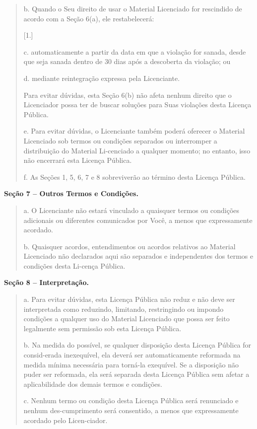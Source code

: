 \documentclass[
]{article}
\begin{document}
\begin{quote}
b. Quando o Seu direito de usar o Material Licenciado for rescindido de
acordo com a Seção 6(a), ele restabelecerá:

{[}1.{]}

c. automaticamente a partir da data em que a violação for sanada, desde
que seja sanada dentro de 30 dias após a descoberta da violação; ou

d. mediante reintegração expressa pela Licenciante.

Para evitar dúvidas, esta Seção 6(b) não afeta nenhum direito que o
Licenciador possa ter de buscar soluções para Suas violações desta
Licença Pública.

e. Para evitar dúvidas, o Licenciante também poderá oferecer o Material
Licenciado sob termos ou condições separados ou interromper a
distribuição do Material Li-cenciado a qualquer momento; no entanto,
isso não encerrará esta Licença Pública.

f. As Seções 1, 5, 6, 7 e 8 sobreviverão ao término desta Licença
Pública.
\end{quote}

\textbf{Seção 7 -- Outros Termos e Condições.}

\begin{quote}
a. O Licenciante não estará vinculado a quaisquer termos ou condições
adicionais ou diferentes comunicados por Você, a menos que expressamente
acordado.

b. Quaisquer acordos, entendimentos ou acordos relativos ao Material
Licenciado não declarados aqui são separados e independentes dos termos
e condições desta Li-cença Pública.
\end{quote}

\textbf{Seção 8 -- Interpretação.}

\begin{quote}
a. Para evitar dúvidas, esta Licença Pública não reduz e não deve ser
interpretada como reduzindo, limitando, restringindo ou impondo
condições a qualquer uso do Material Licenciado que possa ser feito
legalmente sem permissão sob esta Licença Pública.

b. Na medida do possível, se qualquer disposição desta Licença Pública
for consid-erada inexequível, ela deverá ser automaticamente reformada
na medida mínima necessária para torná-la exequível. Se a disposição não
puder ser reformada, ela será separada desta Licença Pública sem afetar
a aplicabilidade dos demais termos e condições.

c. Nenhum termo ou condição desta Licença Pública será renunciado e
nenhum des-cumprimento será consentido, a menos que expressamente
acordado pelo Licen-ciador.
\end{quote}
\end{document}
